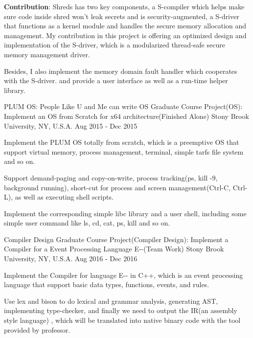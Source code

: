 \begin{cventries}
{\begin{cvitems}
        \item {\textbf{Contribution}: Shreds has two key components, a S-compiler which helps make sure code inside shred won't leak secrets and is security-augmented, a S-driver that functions as a kernel module and handles the secure memory allocation and management. My contribution in this project is offering an optimized design and implementation of the S-driver, which is a modularized  thread-safe secure memory management driver.}
        \item {Besides, I also implement the memory domain fault handler which cooperates with the S-driver. and provide a user interface as well as a run-time helper library.}
      \end{cvitems}
    }
  \cventry
    {PLUM OS: People Like U and Me can write OS}
    {Graduate Course Project(OS): Implement an OS from Scratch for x64 architecture(Finished Alone)}
    {Stony Brook University, NY, U.S.A.}
    {Aug 2015 - Dec 2015}
    {
      \begin{cvitems}
        \item {Implement the PLUM OS totally from scratch, which is a preemptive OS that support virtual memory, process management, terminal, simple tarfs file system and so on.}
        \item {Support demand-paging and copy-on-write, process tracking(ps, kill -9, background running), short-cut for process and screen management(Ctrl-C, Ctrl-L), as well as executing shell scripts.}
        \item {Implement the corresponding simple libc library and a user shell, including some simple user command like ls, cd, cat, ps, kill and so on.}
      \end{cvitems}
    }
   \cventry
    {Compiler Design}
    {Graduate Course Project(Compiler Design): Implement a Compiler for a Event Processing Language E-{}-{}(Team Work)}
    {Stony Brook University, NY, U.S.A.}
    {Aug 2016 - Dec 2016}
    {
      \begin{cvitems}
        \item {Implement the Compiler for language E-{}-{} in C++, which is an event processing language that support basic data types, functions, events, and rules.}
        \item {Use lex and bison to do lexical and grammar analysis, generating AST, implementing type-checker, and finally we need to output the IR(an assembly style language) , which will be translated into native binary code with the tool provided by professor.}

\end{cvitems}}
\end{cventries}

